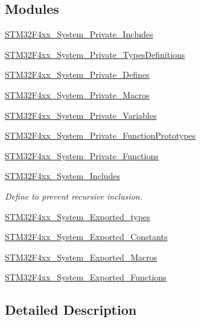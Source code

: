 \subsection*{Modules}
\begin{DoxyCompactItemize}
\item 
\hyperlink{group___s_t_m32_f4xx___system___private___includes}{S\+T\+M32\+F4xx\+\_\+\+System\+\_\+\+Private\+\_\+\+Includes}
\item 
\hyperlink{group___s_t_m32_f4xx___system___private___types_definitions}{S\+T\+M32\+F4xx\+\_\+\+System\+\_\+\+Private\+\_\+\+Types\+Definitions}
\item 
\hyperlink{group___s_t_m32_f4xx___system___private___defines}{S\+T\+M32\+F4xx\+\_\+\+System\+\_\+\+Private\+\_\+\+Defines}
\item 
\hyperlink{group___s_t_m32_f4xx___system___private___macros}{S\+T\+M32\+F4xx\+\_\+\+System\+\_\+\+Private\+\_\+\+Macros}
\item 
\hyperlink{group___s_t_m32_f4xx___system___private___variables}{S\+T\+M32\+F4xx\+\_\+\+System\+\_\+\+Private\+\_\+\+Variables}
\item 
\hyperlink{group___s_t_m32_f4xx___system___private___function_prototypes}{S\+T\+M32\+F4xx\+\_\+\+System\+\_\+\+Private\+\_\+\+Function\+Prototypes}
\item 
\hyperlink{group___s_t_m32_f4xx___system___private___functions}{S\+T\+M32\+F4xx\+\_\+\+System\+\_\+\+Private\+\_\+\+Functions}
\item 
\hyperlink{group___s_t_m32_f4xx___system___includes}{S\+T\+M32\+F4xx\+\_\+\+System\+\_\+\+Includes}
\begin{DoxyCompactList}\small\item\em Define to prevent recursive inclusion. \end{DoxyCompactList}\item 
\hyperlink{group___s_t_m32_f4xx___system___exported__types}{S\+T\+M32\+F4xx\+\_\+\+System\+\_\+\+Exported\+\_\+types}
\item 
\hyperlink{group___s_t_m32_f4xx___system___exported___constants}{S\+T\+M32\+F4xx\+\_\+\+System\+\_\+\+Exported\+\_\+\+Constants}
\item 
\hyperlink{group___s_t_m32_f4xx___system___exported___macros}{S\+T\+M32\+F4xx\+\_\+\+System\+\_\+\+Exported\+\_\+\+Macros}
\item 
\hyperlink{group___s_t_m32_f4xx___system___exported___functions}{S\+T\+M32\+F4xx\+\_\+\+System\+\_\+\+Exported\+\_\+\+Functions}
\end{DoxyCompactItemize}


\subsection{Detailed Description}
